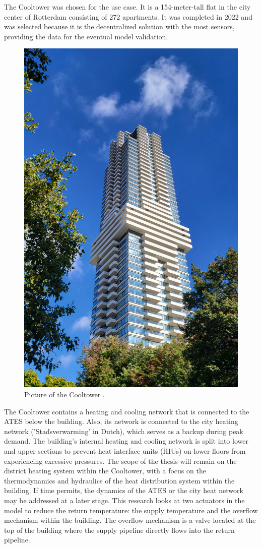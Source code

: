 The Cooltower was chosen for the use case. It is a 154-meter-tall flat in the city center of Rotterdam consisting of 272 apartments. It was completed in 2022 and was selected because it is the decentralized solution with the most sensors, providing the data for the eventual model validation.

\begin{figure}[h]
    \centering
    \includegraphics[width=0.5\linewidth]{figuresLIT/Cooltorenfoto.jpg}
    \caption{Picture of the Cooltower \cite{fotoCooltoren}.}
    \label{fig:Cooltoren}
\end{figure}

The Cooltower contains a heating and cooling network that is connected to the ATES below the building. Also, its network is connected to the city heating network ('Stadsverwarming' in Dutch), which serves as a backup during peak demand. The building's internal heating and cooling network is split into lower and upper sections to prevent heat interface units (HIUs) on lower floors from experiencing excessive pressures. The scope of the thesis will remain on the district heating system within the Cooltower, with a focus on the thermodynamics and hydraulics of the heat distribution system within the building. If time permits, the dynamics of the ATES or the city heat network may be addressed at a later stage.
This research looks at two actuators in the model to reduce the return temperature: the supply temperature and the overflow mechanism within the building. The overflow mechanism is a valve located at the top of the building where the supply pipeline directly flows into the return pipeline. 

